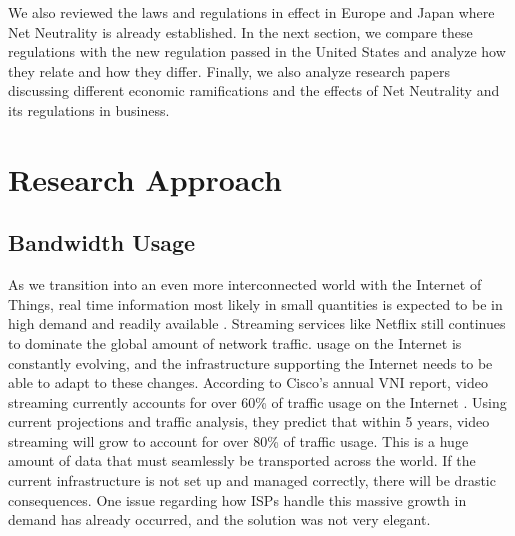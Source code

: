 \documentclass{sigcomm-alternate}
\begin{document}
We also reviewed the laws and regulations in effect in Europe and Japan where Net Neutrality is already established. In the next section, we compare these regulations with the new regulation passed in the United States and analyze how they relate and how they differ. Finally, we also analyze research papers discussing different economic ramifications and the effects of Net Neutrality and its regulations in business. 


\section{Research Approach}

\subsection{Bandwidth Usage}
As we transition into an even more interconnected world with the Internet of Things, real time information most likely in small quantities is expected to be in high demand and readily available \cite{cisco}. Streaming services like Netflix still continues to dominate the global amount of network traffic\cite{Sandvine}. usage on the Internet is constantly evolving, and the infrastructure supporting the Internet needs to be able to adapt to these changes. According to Cisco’s annual VNI report, video streaming currently accounts for over 60\% of traffic usage on the Internet \cite{cisco}. Using current projections and traffic analysis, they predict that within 5 years, video streaming will grow to account for over 80\% of traffic usage. This is a huge amount of data that must seamlessly be transported across the world. If the current infrastructure is not set up and managed correctly, there will be drastic consequences. One issue regarding how ISPs handle this massive growth in demand has already occurred, and the solution was not very elegant.
\end{document}
